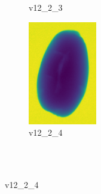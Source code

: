 \documentclass[11pt]{article}
\begin{document}
\begin{figure}
\begin{subfigure}[b]{0.15\textwidth}
        \caption{v12\_2\_3}
         \label{fig:five over x}
     \end{subfigure}
     \hfill
    \begin{subfigure}[b]{0.15\textwidth}
         \centering
         \includegraphics[width=3cm, height=4.5cm]{images/kartofler/v12_2_4_cut.png}
        \caption{v12\_2\_4}
         \label{fig:five over x}
     \end{subfigure}
     
     
        \\ \\
        

\end{figure}
\end{document}
